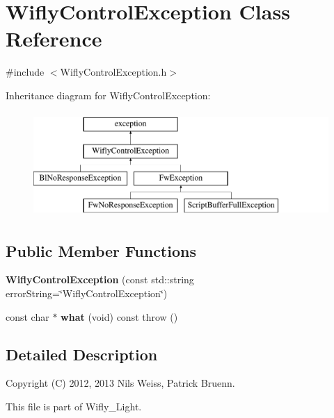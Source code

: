 \hypertarget{class_wifly_control_exception}{\section{Wifly\-Control\-Exception Class Reference}
\label{class_wifly_control_exception}
}


{\ttfamily \#include $<$Wifly\-Control\-Exception.\-h$>$}

Inheritance diagram for Wifly\-Control\-Exception\-:\begin{figure}[H]
\begin{center}
\leavevmode
\includegraphics[height=4.000000cm]{class_wifly_control_exception}
\end{center}
\end{figure}
\subsection*{Public Member Functions}
\begin{DoxyCompactItemize}
\item 
\hypertarget{class_wifly_control_exception_a7c12735a818b900b9b5edb6ee5e0e305}{{\bfseries Wifly\-Control\-Exception} (const std\-::string error\-String=\char`\"{}Wifly\-Control\-Exception\char`\"{})}\label{class_wifly_control_exception_a7c12735a818b900b9b5edb6ee5e0e305}

\item 
\hypertarget{class_wifly_control_exception_a0fa2a5e8db72e6927d29c82968319e78}{const char $\ast$ {\bfseries what} (void) const   throw ()}\label{class_wifly_control_exception_a0fa2a5e8db72e6927d29c82968319e78}

\end{DoxyCompactItemize}


\subsection{Detailed Description}
Copyright (C) 2012, 2013 Nils Weiss, Patrick Bruenn.

This file is part of Wifly\-\_\-\-Light.

